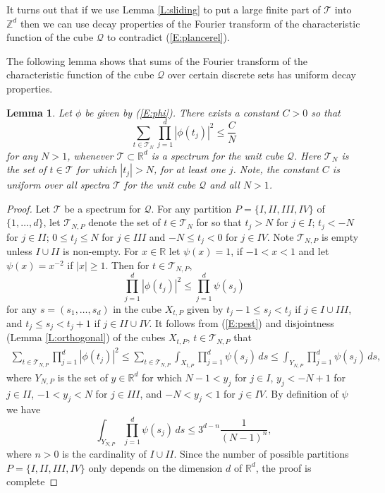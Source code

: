 \documentclass[12pt]{amsart}
\theoremstyle{plain}
\newtheorem{lemma}[theorem]{Lemma}
\numberwithin{equation}{section}
\newcommand{\Q}{\ensuremath{\mathcal{Q}}\xspace}
\newcommand{\T}{\ensuremath{\mathcal{T}}\xspace}
\newcommand{\Rd}{\ensuremath{\mathbb{R}^{d}}\xspace}
\newcommand{\R}{\ensuremath{\mathbb{R}}\xspace}
\newcommand{\Zd}{\ensuremath{\mathbb{Z}^{d}}\xspace}
\begin{document}
It turns out that if we use Lemma \ref{L:sliding} to put a
large finite part of \T into \Zd then we can use decay properties of
the Fourier transform of the characteristic function of the cube \Q
to contradict (\ref{E:plancerel}).

The following lemma shows that sums of the Fourier transform of the
characteristic function of the cube \Q over certain discrete sets
has uniform decay properties.
\begin{lemma}\label{L:estimate}
   Let $\phi$ be given by (\ref{E:phi}).
   There exists a constant $C>0$ so that
   \begin{equation*}
      \sum_{t\in\T_N} \prod_{j=1}^d|\phi(t_j)|^2\leq\frac{C}{N}
   \end{equation*}
   for any $N>1$,
   whenever $\T\subset\Rd$ is a spectrum for the unit cube \Q.
   Here $\T_N$ is the set of $t\in\T$ for which $|t_j|>N$,
   for at least one $j$. Note, the constant $C$ is uniform over all
   spectra \T for the unit cube \Q and all $N>1$.
\end{lemma}
\begin{proof}
   Let \T be a spectrum for \Q.
   For any partition $P=\{I,II,III,IV\}$ of $\{1,\ldots,d\}$, let
   $\T_{N,P}$ denote the set of $t\in\T_N$ for so that $t_j>N$ for
   $j\in I$; $t_j<-N$ for $j\in II$; $0\leq t_j\leq N$ for $j\in III$
   and $-N\leq t_j <0$ for $j\in IV$.
   Note $\T_{N,P}$ is empty unless $I\cup II$ is non-empty.
   For $x\in\R$ let $\psi(x)=1$, if
   $-1<x<1$ and let $\psi(x)=x^{-2}$ if $|x|\geq1$. Then for
   $t\in\T_{N,P}$,
   \begin{equation}\label{E:pest}
      \prod_{j=1}^{d}|\phi(t_j)|^2 \leq \prod_{j=1}^{d} \psi(s_j)
   \end{equation}
   for any $s=(s_1,\ldots,s_d)$ in the cube $X_{t,P}$ given by
   $t_j-1\leq s_j < t_j$ if
   $j\in I\cup III$, and $t_j\leq s_j < t_j+1$ if $j\in II\cup IV$.
   It follows from (\ref{E:pest}) and disjointness (Lemma
   \ref{L:orthogonal}) of the cubes $X_{t,P}$, $t\in\T_{N,P}$ that
   \begin{align*}
      \sum_{t\in\T_{N,P}} \prod_{j=1}^d |\phi(t_j)|^2
      \leq
      \sum_{t\in\T_{N,P}}\int_{X_{t,P}}
         \prod_{j=1}^d \psi(s_j)\,ds
      \leq
      \int_{Y_{N,P}}\prod_{j=1}^d \psi(s_j)\,ds,
   \end{align*}
   where $Y_{N,P}$ is the set of $y\in\Rd$ for which $N-1<y_j$ for
   $j\in I$, $y_j<-N+1$ for $j\in II$, $-1<y_j<N$ for $j\in III$, and
   $-N<y_j<1$ for $j\in IV$. By definition of $\psi$ we have
   \begin{equation*}
      \int_{Y_{N,P}}\prod_{j=1}^d \psi(s_j)\,ds
      \leq 3^{d-n}\frac{1}{(N-1)^{n}},
   \end{equation*}
   where $n>0$ is the cardinality of $I\cup II$. Since the number of
   possible partitions $P=\{I,II,III,IV\}$ only depends on the
   dimension $d$ of \Rd, the proof is complete
\end{proof}
\end{document}

